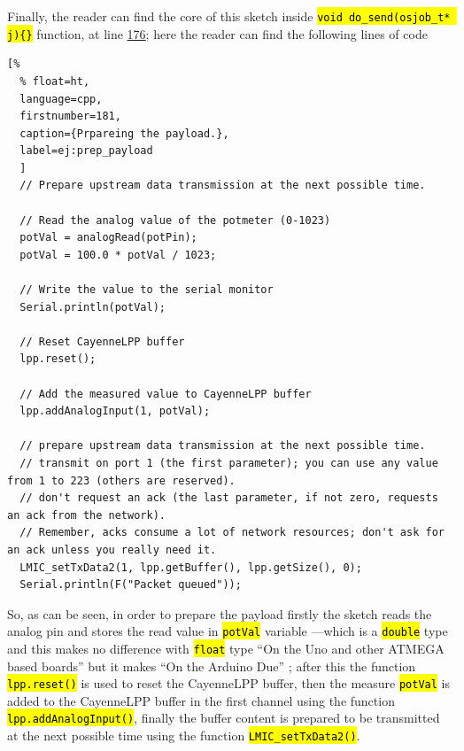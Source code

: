 \documentclass[11pt,a4paper,dvipsnames,twoside]{article}
\newcommand{\doubt}[1] {\textbf{\color{Red3}#1}}
\newcommand{\cmd}[1] {\hl{\texttt{#1}}}
\begin{document}
Finally, the reader can find the core of this sketch inside \cmd{void do\_send(osjob\_t* j)\{\}} function, at line \href{https://github.com/WyRe/lora-arduino-dendrometer/blob/master/src/arduino/dendro/dendro.ino#L176}{176}; here the reader can find the following lines of code

\begin{lstlisting}[%
  % float=ht,
  language=cpp,
  firstnumber=181,
  caption={Prpareing the payload.},
  label=ej:prep_payload
  ]
  // Prepare upstream data transmission at the next possible time.
        
  // Read the analog value of the potmeter (0-1023)
  potVal = analogRead(potPin);
  potVal = 100.0 * potVal / 1023;
  
  // Write the value to the serial monitor
  Serial.println(potVal);
         
  // Reset CayenneLPP buffer
  lpp.reset();

  // Add the measured value to CayenneLPP buffer
  lpp.addAnalogInput(1, potVal);

  // prepare upstream data transmission at the next possible time.
  // transmit on port 1 (the first parameter); you can use any value from 1 to 223 (others are reserved).
  // don't request an ack (the last parameter, if not zero, requests an ack from the network).
  // Remember, acks consume a lot of network resources; don't ask for an ack unless you really need it.
  LMIC_setTxData2(1, lpp.getBuffer(), lpp.getSize(), 0);
  Serial.println(F("Packet queued"));
\end{lstlisting}

So, as can be seen, in order to prepare the payload firstly the sketch reads the analog pin and stores the read value in \cmd{potVal} variable ---which is a \cmd{double} type and this makes no difference with \cmd{float} type \enquote{On the Uno and other ATMEGA based boards} but it makes \enquote{On the Arduino Due} \cite{Ard_double_type}; after this the function \cmd{lpp.reset()} is used to reset the CayenneLPP buffer, then the measure \cmd{potVal} is added to the CayenneLPP buffer in the first channel using the function \cmd{lpp.addAnalogInput()}, finally the buffer content is prepared to be transmitted at the next possible time using the function \cmd{LMIC\_setTxData2()}. 
\end{document}
